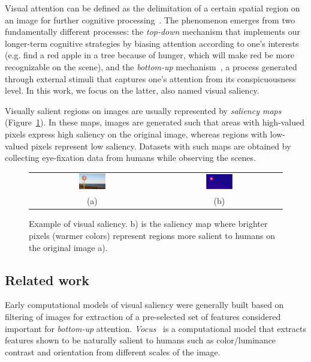 \documentclass[10pt,twocolumn,letterpaper]{article}
\begin{document}
Visual attention can be defined as the delimitation of a certain spatial
region on an image for further cognitive processing~\cite{treisman_1980}.
The phenomenon emerges from two fundamentally different processes:
the \emph{top-down} mechanism that implements our longer-term cognitive
strategies by biasing attention according to one's interests
(e.g. find a red apple in a tree because of hunger,
which will make red be more recognizable on the scene),
and the \emph{bottom-up} mechanism~\cite{colombini_2016},
a process generated through external stimuli
that captures one's attention from its conspicuousness level.
In this work, we focus on the latter, also named visual saliency.

Visually salient regions on images are usually represented by
\emph{saliency maps} (Figure~\ref{fig:example}). In these maps, images are generated such that
areas with high-valued pixels express high saliency on the original image,
whereas regions with low-valued pixels represent low saliency.
Datasets with such maps are obtained by collecting eye-fixation
data from humans while observing the scenes.

\begin{center}
\begin{figure}[t]
\begin{tabular} {cc}
\includegraphics[width=0.22\textwidth]{./img/traffic_sign_s.jpg} &
\includegraphics[width=0.22\textwidth]{./img/traffic_sign_m.jpg}\\
(a) & (b)
\end{tabular}
\caption{Example of visual saliency.
    b) is the saliency map where brighter pixels (warmer colors)
    represent regions more salient to humans on the original image a).}
\label{fig:example}
\end{figure}
\end{center}

\subsection{Related work}
Early computational models of visual saliency were generally built based on
filtering of images for extraction of a pre-selected set of features
considered important for \emph{bottom-up} attention.
\emph{Vocus}~\cite{frintrop_2005} is a computational model that extracts
features shown to be naturally salient to humans such as color/luminance
contrast and orientation from different scales of the image.
\end{document}
